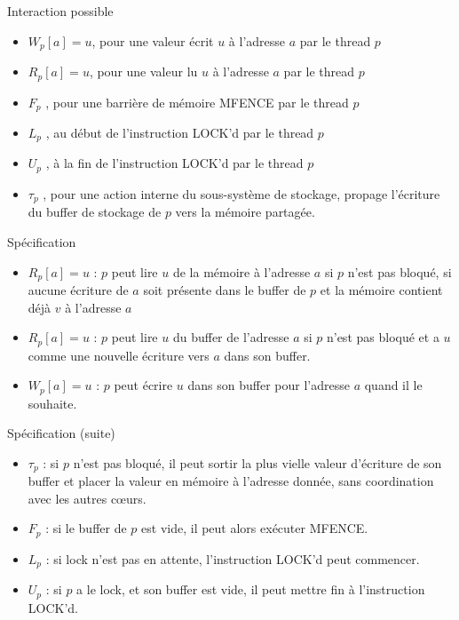 \documentclass{beamer}
\begin{document}
\begin{frame}{Interaction possible}
\begin{itemize}
	\item $W_p[a]=u$, pour une valeur écrit $u$ à l'adresse $a$ par le thread $p$	
	\item $R_p[a]=u$, pour une valeur lu $u$ à l'adresse $a$ par le thread $p$
	\item $F_p$ , pour une barrière de mémoire MFENCE par le thread $p$
	\item $L_p$ , au début de l'instruction LOCK'd par le thread $p$
	\item $U_p$ , à la fin de l'instruction LOCK'd par le thread $p$
	\item $\tau_p$ , pour une action interne du sous-système de stockage, propage l'écriture du buffer de stockage de $p$ vers la mémoire partagée.
\end{itemize}
\end{frame}


\begin{frame}{Spécification}
\begin{itemize}
	\item $R_p[a] = u$ : $p$ peut lire $u$ de la mémoire à l'adresse $a$ si $p$ n'est pas bloqué, si aucune écriture de $a$ soit présente dans le buffer de $p$ et la mémoire contient déjà $v$ à l'adresse $a$
	\item $R_p[a] = u$ : $p$ peut lire $u$ du buffer de l'adresse $a$ si $p$ n'est pas bloqué et a $u$ comme une nouvelle écriture vers $a$ dans son buffer.
	\item $W_p[a] = u$ : $p$ peut écrire $u$ dans son buffer pour l'adresse $a$ quand il le souhaite.
\end{itemize}

\end{frame}
\begin{frame}{Spécification (suite)}
	
\begin{itemize}
	\item $\tau_p$ : si $p$ n'est pas bloqué, il peut sortir la plus vielle valeur d'écriture de son buffer et placer la valeur en mémoire à l'adresse donnée, sans coordination avec les autres cœurs.
	\item $F_p$ : si le buffer de $p$ est vide, il peut alors exécuter MFENCE.
	\item $L_p$ : si lock n'est pas en attente, l'instruction LOCK'd peut commencer.
	\item $U_p$ : si $p$ a le lock, et son buffer est vide, il peut mettre fin à l'instruction LOCK'd.
\end{itemize}
\end{frame}
\end{document}
